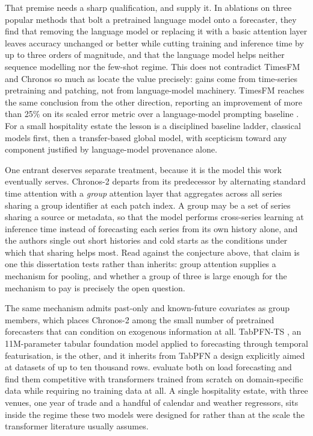 That premise needs a sharp qualification, and \citet{tan_are_2024} supply it.
In ablations on three popular methods that bolt a pretrained language model
onto a forecaster, they find that removing the language model or replacing it
with a basic attention layer leaves accuracy unchanged or better while cutting
training and inference time by up to three orders of magnitude, and that the
language model helps neither sequence modelling nor the few-shot regime. This
does not contradict TimesFM and Chronos so much as locate the value precisely:
gains come from time-series pretraining and patching, not from language-model
machinery. TimesFM reaches the same conclusion from the other direction,
reporting an improvement of more than 25\% on its scaled error metric over a
language-model prompting baseline \citep{das_decoder-only_2024}. For a small
hospitality estate the lesson is a disciplined baseline ladder, classical
models first, then a transfer-based global model, with scepticism toward any
component justified by language-model provenance alone.

One entrant deserves separate treatment, because it is the model this work
eventually serves. Chronos-2 \citep[a 2025 preprint]{ansari_chronos-2_2025}
departs from its predecessor by alternating standard time attention with a
\emph{group} attention layer that aggregates across all series sharing a group
identifier at each patch index. A group may be a set of series sharing a source
or metadata, so that the model performs cross-series learning at inference time
instead of forecasting each series from its own history alone, and the authors
single out short histories and cold starts as the conditions under which that
sharing helps most. Read against the conjecture above, that claim is one this
dissertation tests rather than inherits: group attention supplies a mechanism
for pooling, and whether a group of three is large enough for the mechanism to
pay is precisely the open question.

The same mechanism admits past-only and known-future covariates as group
members, which places Chronos-2 among the small number of pretrained
forecasters that can condition on exogenous information at all. TabPFN-TS
\citep[a 2026 preprint]{hoo_tables_2026}, an 11M-parameter tabular foundation
model applied to forecasting through temporal featurisation, is the other, and
it inherits from TabPFN \citep{hollmann_accurate_2025} a design explicitly
aimed at datasets of up to ten thousand rows. \citet{hertel_explainable_2026}
evaluate both on load forecasting and find them competitive with transformers
trained from scratch on domain-specific data while requiring no training data
at all. A single hospitality estate, with three venues, one year of trade and a
handful of calendar and weather regressors, sits inside the regime these two
models were designed for rather than at the scale the transformer literature
usually assumes.

